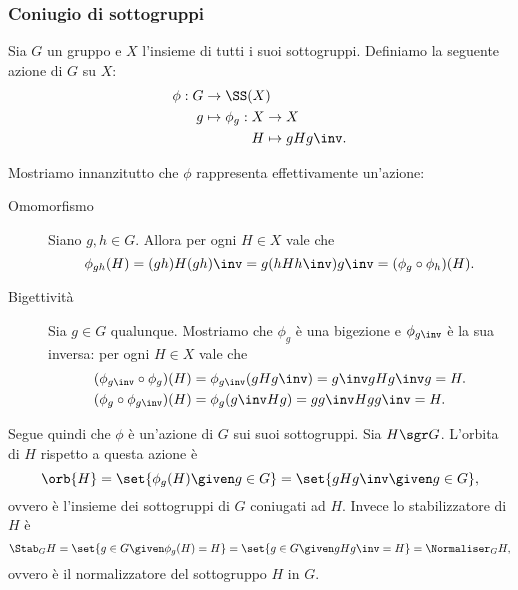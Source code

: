 \subsubsection{Coniugio di sottogruppi}
Sia $G$ un gruppo e $X$ l'insieme di tutti i suoi sottogruppi. Definiamo la seguente azione di $G$ su $X$:
\begin{align*}
    \phi : G &\to \SS(X)\\
           g &\mapsto 
    \begin{alignedat}[t]{1}
        \phi_g : X &\to X\\
                 H &\mapsto gHg\inv.
    \end{alignedat}
\end{align*}

Mostriamo innanzitutto che $\phi$ rappresenta effettivamente un'azione:
\begin{description}
    \item[Omomorfismo] Siano $g, h \in G$. Allora per ogni $H \in X$ vale che \[
        \phi_{gh}(H) = (gh)H(gh)\inv = g(hHh\inv)g\inv = (\phi_g \circ \phi_h)(H).
    \]
    \item[Bigettività] Sia $g \in G$ qualunque. Mostriamo che $\phi_g$ è una bigezione e $\phi_{g\inv}$ è la sua inversa: per ogni $H \in X$ vale che \begin{align*}
        &(\phi_{g\inv} \circ \phi_g)(H) = \phi_{g\inv}(gHg\inv) = g\inv gHg\inv g = H.\\
        &(\phi_{g} \circ \phi_{g\inv})(H) = \phi_{g}(g\inv Hg) = gg\inv Hgg\inv = H.
    \end{align*}
\end{description}

Segue quindi che $\phi$ è un'azione di $G$ sui suoi sottogruppi. Sia $H \sgr G$. L'orbita di $H$ rispetto a questa azione è \[
    \orb{H} = \set{\phi_g(H) \given g \in G} = \set{gHg\inv \given g \in G},
\] ovvero è l'insieme dei sottogruppi di $G$ coniugati ad $H$. Invece lo stabilizzatore di $H$ è \[
    \Stab_{G}{H} = \set{g \in G \given \phi_g(H) = H}
    = \set{g \in G \given gHg\inv = H} = \Normaliser_{G}{H},
\] ovvero è il normalizzatore del sottogruppo $H$ in $G$.

